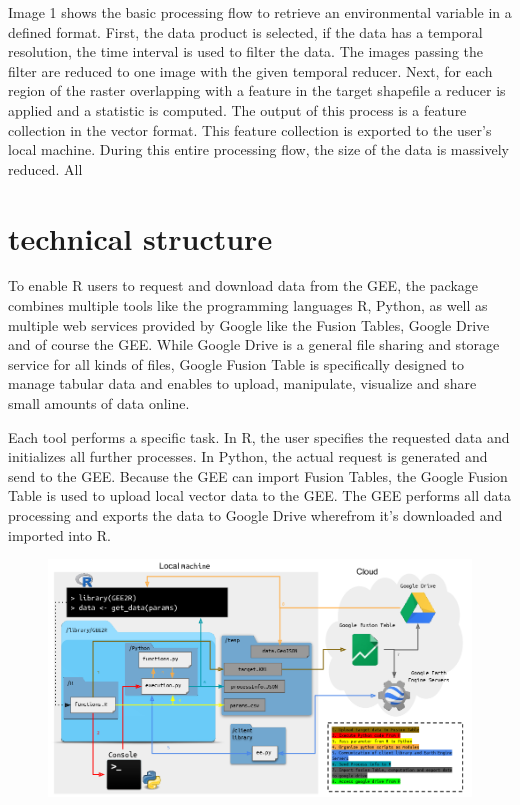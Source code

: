 Image 1 shows the basic processing flow to retrieve an environmental variable in a defined format. First, the data product is selected, if the data has a temporal resolution, the time interval is used to filter the data. The images passing the filter are reduced to one image with the given temporal reducer. Next, for each region of the raster overlapping with a feature in the target shapefile a reducer is applied and a statistic is computed. The output of this process is a feature collection in the vector format. This feature collection is exported to the user's local machine.
During this entire processing flow, the size of the data is massively reduced. All 



\section{technical structure}

To enable R users to request and download data from the GEE, the package combines multiple tools like the programming languages R, Python, as well as multiple web services provided by Google like the Fusion Tables, Google Drive and of course the GEE. While Google Drive is a general file sharing and storage service for all kinds of files, Google Fusion Table is specifically designed to manage tabular data and enables to upload, manipulate, visualize and share small amounts of data online.

Each tool performs a specific task. In R, the user specifies the requested data and initializes all further processes. In Python, the actual request is generated and send to the GEE. Because the GEE can import Fusion Tables, the Google Fusion Table is used to upload local vector data to the GEE. The GEE performs all data processing and exports the data to Google Drive wherefrom it's downloaded and imported into R. 


\begin{center}
	
	\begin{figure}[h]
		\begin{center}
			\includegraphics[width=15cm]{images/processin_folw.pdf}
		\end{center}
	\end{figure}
\end{center}

